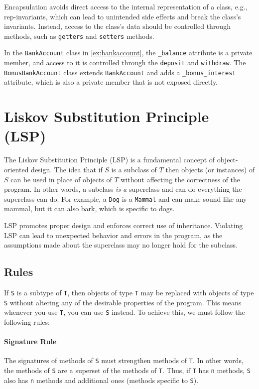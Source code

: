 \documentclass[oneside,11pt,dvipsnames]{book}
\newcommand{\code}[1]{\texttt{#1}}
\begin{document}
Encapsulation avoids direct access to the internal representation of a class, e.g., rep-invariants, which can lead to unintended side effects and break the class's invariants. Instead, access to the class's data should be controlled through methods, such as \code{getters} and \code{setters} methods.

In the \code{BankAccount} class in \autoref{ex:bankaccount}, the \code{\_balance} attribute is a private member, and access to it is controlled through the \code{deposit} and \code{withdraw}. The \code{BonusBankAccount} class extends \code{BankAccount} and adds a \code{\_bonus\_interest} attribute, which is also a private member that is not exposed directly. 



\section{Liskov Substitution Principle (LSP)}
The Liskov Substitution Principle (LSP) is a fundamental concept of object-oriented design.  
The idea that if $S$ is a subclass of $T$ then objects (or instances) of $S$ can be used in place of objects of $T$ without affecting the correctness of the program. In other words, a subclass \emph{is-a} superclass and can do everything the superclass can do.
For example, a \code{Dog} is a \code{Mammal} and can make sound like any mammal, but it can also bark, which is specific to dogs.

LSP promotes proper design and enforces correct use of inheritance.
Violating LSP can lead to unexpected behavior and errors in the program, as the assumptions made about the superclass may no longer hold for the subclass. 

\subsection{Rules} 
If \code{S} is a subtype of \code{T}, then objects of type \code{T} may be replaced with objects of type \code{S} without altering any of the desirable properties of the program. This means whenever you use \code{T}, you can use \code{S} instead. To achieve this, we must follow the following rules:

\paragraph{Signature Rule} The signatures of methods of \code{S} must strengthen methods of \code{T}. In other words, the methods of \code{S} are a superset of the methods of \code{T}. Thus, if \code{T} has \code{n} methods, \code{S} also has \code{n} methods and additional ones (methods specific to \code{S}). 
\end{document}
